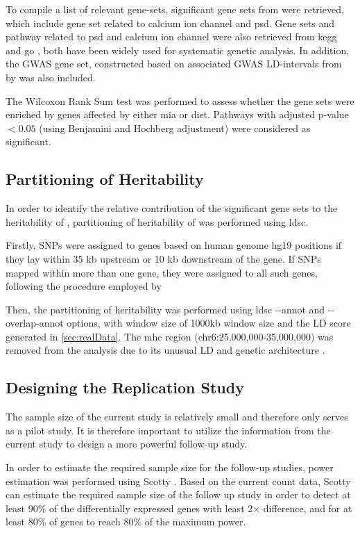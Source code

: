 To compile a list of relevant gene-sets, significant gene sets from \citet{Purcell2014,Consortium2015a} were retrieved, which include gene set related to calcium ion channel and \gls{psd}.
Gene sets and pathway related to \gls{psd} and calcium ion channel were also retrieved from \gls{kegg} \citep{Kanehisa2000} and \gls{go} \citep{Consortium2015b}, both have been widely used for systematic genetic analysis.
In addition, the  \gls{GWAS} gene set, constructed based on associated \gls{GWAS} \gls{LD}-intervals from \citet{Ripke2013} by \citet{Purcell2014} was also included.


The Wilcoxon Rank Sum test was performed to assess whether the gene sets were enriched by genes affected by either \gls{mia} or diet.
Pathways with adjusted p-value $<0.05$ (using Benjamini and Hochberg adjustment) were considered as significant.

\subsection{Partitioning of Heritability}
In order to identify the relative contribution of the significant gene sets to the heritability of , partitioning of heritability of  was performed using \gls{ldsc}.

Firstly, \glspl{SNP} were assigned to genes based on human genome hg19 positions if they lay within 35 \gls{kb} upstream or 10 \gls{kb} downstream of the gene.
If \glspl{SNP} mapped within more than one gene, they were assigned to all such genes, following the procedure employed by \citet{Consortium2015a}

Then, the partitioning of heritability was performed using \gls{ldsc} \citep{Bulik-Sullivan2015} -{}-annot and -{}-overlap-annot options, with window size of 1000\gls{kb} window size and the \gls{LD} score generated in \cref{sec:realData}.
The \gls{mhc} region (chr6:25,000,000-35,000,000) was removed from the analysis due to its unusual \gls{LD} and genetic architecture \citep{Finucane2015}.

\subsection{Designing the Replication Study}
The sample size of the current study is relatively small and therefore only serves as a pilot study.
It is therefore important to utilize the information from the current study to design a more powerful follow-up study.

In order to estimate the required sample size for the follow-up studies, power estimation was performed using Scotty \citep{Busby2013}.
Based on the current count data, Scotty can estimate the required sample size of the follow up study in order to detect at least 90\% of the differentially expressed genes with least 2$\times$ difference, and for at least 80\% of genes to reach 80\% of the maximum power.

